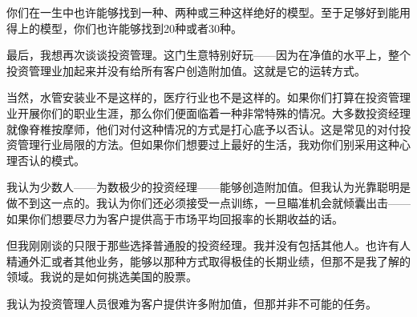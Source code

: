 你们在一生中也许能够找到一种、两种或三种这样绝好的模型。至于足够好到能用得上的模型，你们也许能够找到20种或者30种。
\par

最后，我想再次谈谈投资管理。这门生意特别好玩——因为在净值的水平上，整个投资管理业加起来并没有给所有客户创造附加值。这就是它的运转方式。
\par

当然，水管安装业不是这样的，医疗行业也不是这样的。如果你们打算在投资管理业开展你们的职业生涯，那么你们便面临着一种非常特殊的情况。大多数投资经理就像脊椎按摩师，他们对付这种情况的方式是打心底予以否认。这是常见的对付投资管理行业局限的方法。但如果你们想要过上最好的生活，我劝你们别采用这种心理否认的模式。
\par

我认为少数人——为数极少的投资经理——能够创造附加值。但我认为光靠聪明是做不到这一点的。我认为你们还必须接受一点训练，一旦瞄准机会就倾囊出击——如果你们想要尽力为客户提供高于市场平均回报率的长期收益的话。
\par

但我刚刚谈的只限于那些选择普通股的投资经理。我并没有包括其他人。也许有人精通外汇或者其他业务，能够以那种方式取得极佳的长期业绩，但那不是我了解的领域。我说的是如何挑选美国的股票。
\par

我认为投资管理人员很难为客户提供许多附加值，但那并非不可能的任务。
\par
